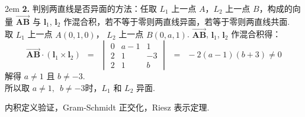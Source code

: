 \documentclass[UTF8,14pt,normal]{ctexart}
\begin{document}
    \hangindent 2em
    \noindent
    \textbf{2.} 判别两直线是否异面的方法：任取 $L_{1}$ 上一点 $A$，$L_{2}$ 上一点 $B$，构成的向量 $\boldsymbol{\overrightarrow{AB}}$ 
    与 $\boldsymbol{l}_{1}$, $\boldsymbol{l}_{2}$ 作混合积，若不等于零则两直线异面，若等于零则两直线共面.\\
    取 $L_{1}$ 上一点 $A(0,1,0)$， $L_{2}$ 上一点 $B(0,a,1)$.
    $\boldsymbol{\overrightarrow{AB}}$, $\boldsymbol{l}_{1}$, $\boldsymbol{l}_{2}$ 作混合积得：\\
    \[\boldsymbol{\overrightarrow{AB}} \cdot (\boldsymbol{l}_{1} \times \boldsymbol{l}_{2}) \enspace = \enspace 
    \begin{vmatrix}
        0 & a - 1 & 1 \\
        2 & 1 & -3 \\
        2 & 1 & b
    \end{vmatrix} \enspace = \enspace -2(a - 1)(b + 3) \neq 0\]
    解得 $a \neq 1$ 且 $ b \neq -3$. \\
    所以取 $ a \neq 1, \enspace b \neq -3$时，$L_{1}$ 和 $L_{2}$ 异面.

内积定义验证，Gram-Schmidt 正交化，Riesz 表示定理.
\end{document}
